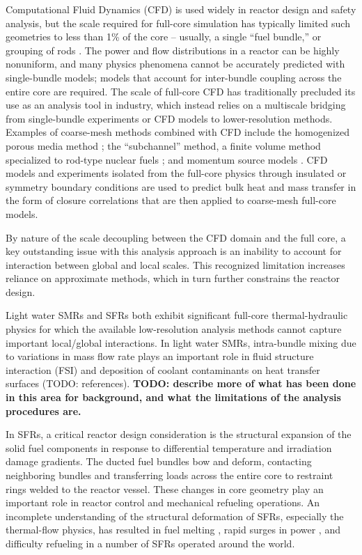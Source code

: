 Computational Fluid Dynamics (CFD) is used widely in reactor design and safety
analysis, but the scale required for full-core simulation has typically limited
such geometries to less than 1\% of the core -- usually, a single ``fuel
bundle,'' or grouping of rods \cite{wang2020,fanning,wang2020b}. The power and
flow distributions in a reactor can be highly nonuniform, and many physics
phenomena cannot be accurately predicted with single-bundle models; models that
account for inter-bundle coupling across the entire core are required.  The
scale of full-core CFD has traditionally precluded its use as an analysis tool
in industry,  which instead relies on a multiscale bridging from single-bundle
experiments or CFD models to lower-resolution methods. Examples of coarse-mesh
methods combined with CFD include the homogenized porous media method
\cite{wang2020c}; the ``subchannel'' method, a finite volume method specialized
to rod-type nuclear fuels \cite{blyth}; and momentum source models
\cite{hu2013}. CFD models and experiments isolated from the full-core physics
through insulated or symmetry boundary conditions are used to predict bulk heat
and mass transfer in the form of closure correlations that are then applied to
coarse-mesh full-core models.

By nature of the scale decoupling between the CFD domain and the full core, a
key outstanding issue with this analysis approach is an inability to account
for interaction between global and local scales. This recognized limitation
increases reliance on approximate methods, which in turn further constrains the
reactor design.

Light water SMRs and SFRs both exhibit significant full-core thermal-hydraulic
physics for which the available low-resolution analysis methods cannot capture
important local/global interactions. In light water SMRs, intra-bundle mixing
due to variations in mass flow rate plays an important role in fluid structure
interaction (FSI) and deposition of coolant contaminants on heat transfer
surfaces (TODO: references). {\bf TODO: describe more of what has been done in
this area for background, and what the limitations of the analysis procedures
are.}

In SFRs, a critical reactor design consideration is the structural expansion of
the solid fuel components in response to differential temperature and
irradiation damage gradients. The ducted fuel bundles bow and deform,
contacting neighboring bundles and transferring loads across the entire core to
restraint rings welded to the reactor vessel. These changes in core geometry
play an important role in reactor control and mechanical refueling operations.
An incomplete understanding of the structural deformation of SFRs, especially
the thermal-flow physics, has resulted in fuel melting \cite{brittan}, rapid
surges in power \cite{chaumont}, and difficulty refueling \cite{shields} in a
number of SFRs operated around the world.

